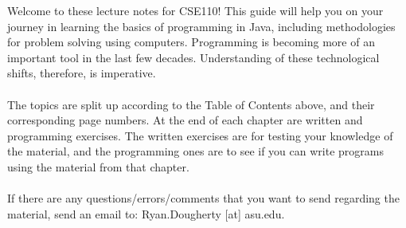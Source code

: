 %
\newpage
\tableofcontents
\newpage
%
%
Welcome to these lecture notes for CSE110! This guide will help you on your journey in learning the basics of programming in Java, including methodologies for problem solving using computers. Programming is becoming more of an important tool in the last few decades. Understanding of these technological shifts, therefore, is imperative. 
\\ \\
The topics are split up according to the Table of Contents above, and their corresponding page numbers. At the end of each chapter are written and programming exercises. The written exercises are for testing your knowledge of the material, and the programming ones are to see if you can write programs using the material from that chapter. 
\\ \\
If there are any questions/errors/comments that you want to send regarding the material, send an email to: Ryan.Dougherty [at] asu.edu.